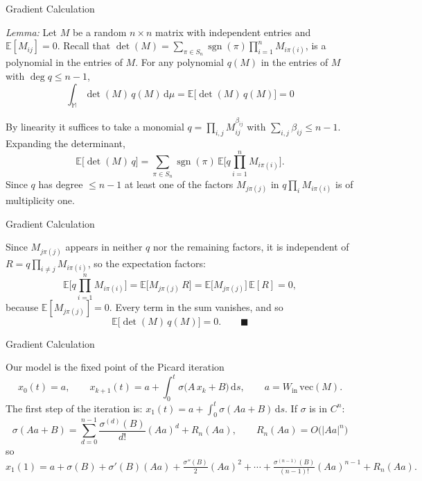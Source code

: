 \documentclass[aspectratio=169]{beamer}
\begin{document}
\begin{frame}{Gradient Calculation}

\emph{Lemma:} Let $M$ be a random $n\times n$ matrix with independent entries and
$\mathbb{E}[M_{ij}]=0$.
Recall that $\det(M)=\sum_{\pi\in S_n}\operatorname{sgn}(\pi)\prod_{i=1}^{n} M_{i\pi(i)}$,
is a polynomial in the entries of $M$. For any polynomial $q(M)$ in the entries of $M$ with $\deg q \le n-1$,
\[
\int_\mathbb{M} \det(M)\,q(M)\,\mathrm{d}\mu = \mathbb{E}\big[\det(M)\,q(M)\big] = 0
\]

By linearity it suffices to take a monomial $q = \prod_{i,j} M_{ij}^{\beta_{ij}}$ with
$\sum_{i,j} \beta_{ij} \le n-1$. Expanding the determinant,
\[
\mathbb{E}\big[\det(M)\,q\big]
= \sum_{\pi\in S_n} \operatorname{sgn}(\pi)\,
  \mathbb{E}\Big[q\textstyle\prod_{i=1}^{n} M_{i\pi(i)}\Big].
\]
Since $q$ has degree $\le n-1$ at least one of the factors $M_{j\pi(j)}$ in $q\prod_i M_{i\pi(i)}$ is of multiplicity one.

\end{frame}


\begin{frame}{Gradient Calculation}

Since $M_{j\pi(j)}$ appears in neither $q$ nor the remaining factors, it is independent
of $R = q\prod_{i\ne j} M_{i\pi(i)}$, so the expectation factors:
\[
\mathbb{E}\Big[q\textstyle\prod_{i=1}^{n} M_{i\pi(i)}\Big]
= \mathbb{E}\big[M_{j\pi(j)}\,R\big]
= \mathbb{E}\big[M_{j\pi(j)}\big]\,\mathbb{E}[R] = 0,
\]
because $\mathbb{E}[M_{j\pi(j)}]=0$. Every term in the sum vanishes, and so
\[
\mathbb{E}\big[\det(M)\,q(M)\big] = 0. \qquad\blacksquare
\]

\end{frame}


\begin{frame}{Gradient Calculation}

Our model is the fixed point of the Picard iteration
\[
x_0(t)=a,\qquad x_{k+1}(t)=a+\int_0^t\sigma\big(A\,x_k+B\big)\,\mathrm{d}s,\qquad a=W_{\mathrm{in}}\,\mathrm{vec}(M).
\]
The first step of the iteration is: $x_1(t)=a+\int_0^t\sigma(Aa+B)\,\mathrm{d}s$. If $\sigma$ is in $C^n$:
\[
\sigma(Aa+B)=\sum_{d=0}^{n-1}\frac{\sigma^{(d)}(B)}{d!}(Aa)^{d}+ R_n(Aa),\qquad R_n(Aa)=O\big(|Aa|^{n}\big)
\]
so $x_1(1)=a+\sigma(B)+\sigma'(B)(Aa)+\frac{\sigma''(B)}{2}(Aa)^2+\cdots+\frac{\sigma^{(n-1)}(B)}{(n-1)!}(Aa)^{n-1}+R_n(Aa).$

\end{frame}
\end{document}
